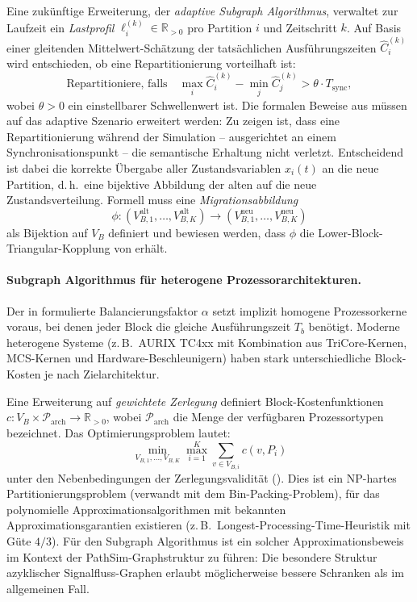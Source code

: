 ﻿\documentclass[12pt,a4paper]{article}
\theoremstyle{definition}
\begin{document}
Eine zukünftige Erweiterung, der \emph{adaptive Subgraph Algorithmus},
verwaltet zur Laufzeit ein \emph{Lastprofil}
$\ell_i^{(k)} \in \mathbb{R}_{>0}$ pro Partition $i$ und Zeitschritt $k$.
Auf Basis einer gleitenden Mittelwert-Schätzung der tatsächlichen
Ausführungszeiten $\hat{C}_i^{(k)}$ wird entschieden, ob eine
Repartitionierung vorteilhaft ist:
\[
  \text{Repartitioniere, falls} \quad
  \max_i \hat{C}_i^{(k)} - \min_j \hat{C}_j^{(k)}
  > \theta \cdot T_{\mathrm{sync}},
\]
wobei $\theta > 0$ ein einstellbarer Schwellenwert ist. Die formalen
Beweise aus  müssen auf das
adaptive Szenario erweitert werden: Zu zeigen ist, dass eine
Repartitionierung während der Simulation -- ausgerichtet an einem
Synchronisationspunkt -- die semantische Erhaltung nicht verletzt.
Entscheidend ist dabei die korrekte Übergabe aller Zustandsvariablen
$x_i(t)$ an die neue Partition, d.\,h.\ eine bijektive Abbildung
der alten auf die neue Zustandsverteilung. Formell muss eine
\emph{Migrationsabbildung}
\[
  \phi : (V_{B,1}^{\text{alt}},\ldots,V_{B,K}^{\text{alt}})
  \longrightarrow
  (V_{B,1}^{\text{neu}},\ldots,V_{B,K}^{\text{neu}})
\]
als Bijektion auf $V_B$ definiert und bewiesen werden, dass
$\phi$ die Lower-Block-Triangular-Kopplung von 
erhält.

\paragraph{Subgraph Algorithmus für heterogene Prozessorarchitekturen.}
Der in  formulierte Balancierungsfaktor $\alpha$
setzt implizit homogene Prozessorkerne voraus, bei denen jeder Block
die gleiche Ausführungszeit $T_b$ benötigt. Moderne heterogene
Systeme (z.\,B.\ AURIX TC4xx mit Kombination aus
TriCore-Kernen, MCS-Kernen und Hardware-Beschleunigern) haben
stark unterschiedliche Block-Kosten je nach Zielarchitektur.

Eine Erweiterung auf \emph{gewichtete Zerlegung} definiert
Block-Kostenfunktionen $c : V_B \times \mathcal{P}_{\mathrm{arch}} \to \mathbb{R}_{>0}$,
wobei $\mathcal{P}_{\mathrm{arch}}$ die Menge der verfügbaren
Prozessortypen bezeichnet. Das Optimierungsproblem lautet:
\[
  \min_{V_{B,1},\ldots,V_{B,K}} \max_{i=1}^K \sum_{v \in V_{B,i}} c(v, P_i)
\]
unter den Nebenbedingungen der Zerlegungsvalidität ().
Dies ist ein NP-hartes Partitionierungsproblem (verwandt mit dem
Bin-Packing-Problem), für das polynomielle Approximationsalgorithmen
mit bekannten Approximationsgarantien existieren (z.\,B.\ Longest-Processing-Time-Heuristik
mit Güte $4/3$). Für den Subgraph Algorithmus ist ein solcher
Approximationsbeweis im Kontext der PathSim-Graphstruktur zu
führen: Die besondere Struktur azyklischer Signalfluss-Graphen
erlaubt möglicherweise bessere Schranken als im allgemeinen Fall.
\end{document}
